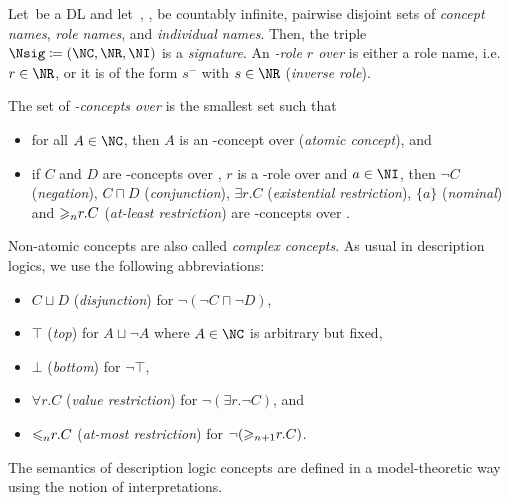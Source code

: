 \begin{definition}
  \label{def:syntax-concepts}
  Let~\Lmc be a DL and let~\NC, \NR, \NI be countably infinite, pairwise disjoint sets of
  \emph{concept names}, \emph{role names}, and \emph{individual names}. Then, the triple
  $\Nsig\coloneqq(\NC,\NR,\NI)$ is a \emph{signature}. An \emph{\Lmc-role $r$ over \Nsig} is either
  a role name, i.e.~$r\in\NR$, or it is of the form $s^{-}$ with $s\in\NR$ (\emph{inverse role}).

  The set of \emph{\Lmc-concepts over \Nsig} is the smallest set such that
  \begin{itemize}
  \item for all $A\in\NC$, then $A$ is an \Lmc-concept over \Nsig (\emph{atomic concept}), and
  \item if $C$ and $D$ are \Lmc-concepts over \Nsig, $r$ is a \Lmc-role over \Nsig and $a\in\NI$, then
    $\lnot C$ (\emph{negation}), $C\sqcap D$ (\emph{conjunction}), $\exists r.C$ (\emph{existential
      restriction}), $\{a\}$ (\emph{nominal}) and ${\geqslant_{n}}r.C$ (\emph{at-least restriction})
    are \Lmc-concepts over \Nsig. \qedhere
  \end{itemize}
\end{definition}

\noindent Non-atomic concepts are also called \emph{complex concepts}. As usual in description
logics, we use the following abbreviations:
\begin{itemize}
\item $C\sqcup D$ (\emph{disjunction}) for $\lnot(\lnot C \sqcap \lnot D)$,
\item $\top$ (\emph{top}) for $A \sqcup \lnot A$ where $A\in\NC$ is arbitrary but fixed,
\item $\bot$ (\emph{bottom}) for $\lnot\top$,
\item $\forall r.C$ (\emph{value restriction}) for $\lnot(\exists r.\lnot C)$, and
\item ${\leqslant_{n}}r.C$ (\emph{at-most restriction}) for $\lnot({\geqslant_{n+1}}r.C)$.
\end{itemize}

\noindent
The semantics of description logic concepts are defined in a model-theoretic way using the notion of
interpretations.

